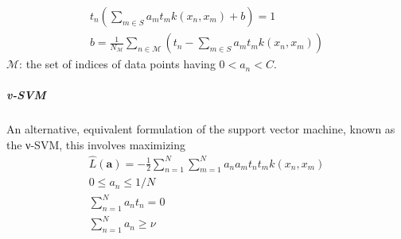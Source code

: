 \documentclass[a4paper]{article}
\begin{document}
\begin{align}
t_n(\sum_{m \in S} a_mt_mk(x_n,x_m)+b) = 1\\
b = \frac{1}{N_{\mathcal{M}}} \sum_{n \in \mathcal{M}} (t_n - \sum_{m \in S} a_mt_mk(x_n,x_m))
\end{align}
$\mathcal{M}$: the set of indices of data points having $0 < a_n < C$.

\subparagraph{v-SVM}
An alternative, equivalent formulation of the support vector machine, known as the ν-SVM, this involves maximizing
\begin{align}
\widehat{L}(\mathbf{a}) = - \frac{1}{2} \sum_{n=1}^N\sum_{m=1}^N a_na_mt_nt_mk(x_n,x_m)\\
0 \leq a_n \leq 1/N\\
\sum_{n=1}^N a_nt_n = 0\\
\sum_{n=1}^N a_n \geq \nu
\end{align}
\end{document}
